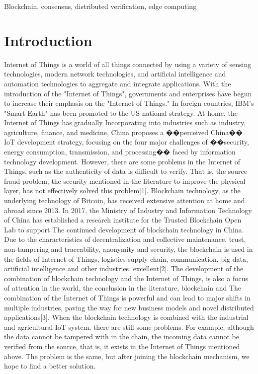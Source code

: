 \documentclass{ieeeaccess}
\begin{document}
\begin{keywords}
Blockchain, consensus, distributed verification, edge computing
\end{keywords}

\titlepgskip=-15pt

\maketitle

\section{Introduction}
\label{sec:introduction}
 Internet of Things is a world of all things connected by using a variety of sensing technologies, modern network technologies, and artificial intelligence and automation technologies to aggregate and integrate applications. With the introduction of the "Internet of Things", governments and enterprises have begun to increase their emphasis on the "Internet of Things." In foreign countries, IBM's "Smart Earth" has been promoted to the US national strategy. At home, the Internet of Things has gradually Incorporating into industries such as industry, agriculture, finance, and medicine, China proposes a ��perceived China�� IoT development strategy, focusing on the four major challenges of ��security, energy consumption, transmission, and processing�� faced by information technology development. However, there are some problems in the Internet of Things, such as the authenticity of data is difficult to verify. That is, the source fraud problem, the security mentioned in the literature to improve the physical layer, has not effectively solved this problem[1]. Blockchain technology, as the underlying technology of Bitcoin, has received extensive attention at home and abroad since 2013. In 2017, the Ministry of Industry and Information Technology of China has established a research institute for the Trusted Blockchain Open Lab to support The continued development of blockchain technology in China. Due to the characteristics of decentralization and collective maintenance, trust, non-tampering and traceability, anonymity and security, the blockchain is used in the fields of Internet of Things, logistics supply chain, communication, big data, artificial intelligence and other industries. excellent[2]. The development of the combination of blockchain technology and the Internet of Things, is also a focus of attention in the world, the conclusion in the literature, blockchain and The combination of the Internet of Things is powerful and can lead to major shifts in multiple industries, paving the way for new business models and novel distributed applications[3]. When the blockchain technology is combined with the industrial and agricultural IoT system, there are still some problems. For example, although the data cannot be tampered with in the chain, the incoming data cannot be verified from the source, that is, it exists in the Internet of Things mentioned above. The problem is the same, but after joining the blockchain mechanism, we hope to find a better solution.
\end{document}
